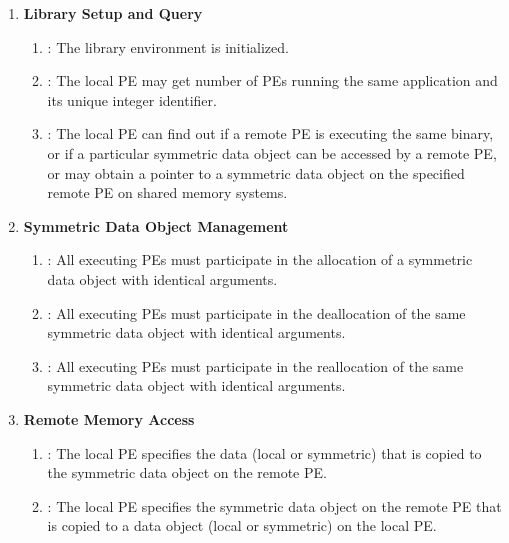 \begin{enumerate}
\item \textbf{Library Setup and Query}

\begin{enumerate}
\item {}: The \openshmem library environment is initialized. 
\item {}: The local \ac{PE} may get number of \acp{PE} running the same application and its unique integer identifier. 
\item {}: The local \ac{PE} can find out if a remote \ac{PE} is executing the same binary, or if a particular symmetric data object can be accessed by a remote \ac{PE}, or may obtain a pointer to a symmetric data object on the specified remote \ac{PE} on shared memory systems.
\end{enumerate}

\item \textbf{Symmetric Data Object Management}
\begin{enumerate}
\item {}: All executing \ac{PE}s must participate in the allocation of a symmetric data object with identical arguments.
\item  {}: All executing \ac{PE}s must participate in the deallocation of the same symmetric data object with identical arguments.
\item  {}: All executing \ac{PE}s must participate in the reallocation of the same symmetric data object with identical arguments.
\end{enumerate}

\item \textbf{Remote Memory Access}

\begin{enumerate}
\item \PUT: The local \ac{PE} specifies the \source{}
data (local or symmetric) that is copied to the symmetric data object on the remote \ac{PE}. 
\item \GET: The local \ac{PE} specifies the symmetric data object on the remote \ac{PE}
that is copied to a data object (local or symmetric) on the local \ac{PE}. 
\end{enumerate}


\end{enumerate}
